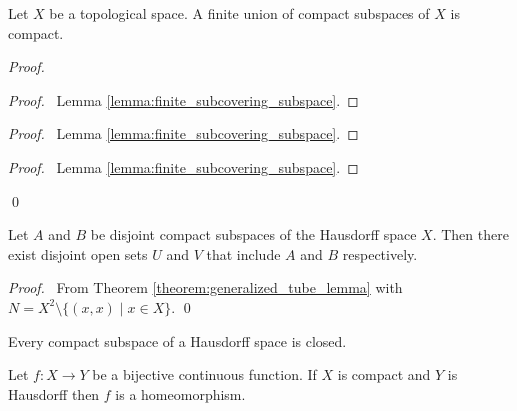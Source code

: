\begin{proposition}
    Let $X$ be a topological space. A finite union of compact subspaces of $X$ is compact.
\end{proposition}

\begin{proof}
    \pf
    \begin{proof}
        \pf\ Lemma \ref{lemma:finite_subcovering_subspace}.
    \end{proof}
    \begin{proof}
        \pf\ Lemma \ref{lemma:finite_subcovering_subspace}.
    \end{proof}
    \qedstep
    \begin{proof}
        \pf\ Lemma \ref{lemma:finite_subcovering_subspace}.
    \end{proof}
    \qed
\end{proof}

\begin{proposition}
    \label{proposition:disjoint_neighbourhoods_compact_Hausdorff}
    Let $A$ and $B$ be disjoint compact subspaces of the Hausdorff space $X$.
    Then there exist disjoint open sets $U$ and $V$ that include $A$ and $B$
    respectively.
\end{proposition}

\begin{proof}
    \pf\ From Theorem \ref{theorem:generalized_tube_lemma} with $N = X^2 \setminus \{ (x,x) \mid x \in X \}$. \qed
\end{proof}

\begin{corollary}
    \label{corollary:closed_compact}
    Every compact subspace of a Hausdorff space is closed.
\end{corollary}

\begin{theorem}
    Let $f : X \rightarrow Y$ be a bijective continuous function. If $X$ is
    compact and $Y$ is Hausdorff then $f$ is a homeomorphism.
\end{theorem}

